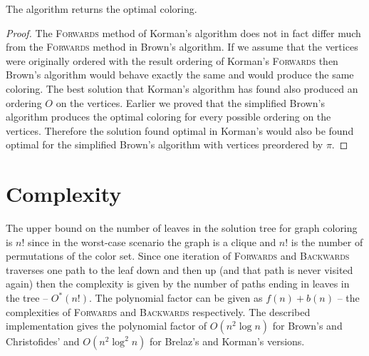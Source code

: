 \begin{theorem}
    The algorithm returns the optimal coloring.
\end{theorem}
\begin{proof}
    The \textsc{Forwards} method of Korman's algorithm does not in fact differ much from the \textsc{Forwards} method in Brown's algorithm. If we assume that the vertices were originally ordered with the result ordering of Korman's \textsc{Forwards} then Brown's algorithm would behave exactly the same and would produce the same coloring. The best solution that Korman's algorithm has found also produced an ordering $O$ on the vertices. Earlier we proved that the simplified Brown's algorithm produces the optimal coloring for every possible ordering on the vertices. Therefore the solution found optimal in Korman's would also be found optimal for the simplified Brown's algorithm with vertices preordered by $\pi$.
\end{proof}

\section{Complexity}
The upper bound on the number of leaves in the solution tree for graph coloring is $n!$ since in the worst-case scenario the graph is a clique and $n!$ is the number of permutations of the color set. Since one iteration of \textsc{Forwards} and \textsc{Backwards} traverses one path to the leaf down and then up (and that path is never visited again) then the complexity is given by the number of paths ending in leaves in the tree -- $O^*(n!)$. The polynomial factor can be given as $f(n)+b(n)$ -- the complexities of \textsc{Forwards} and \textsc{Backwards} respectively. The described implementation gives the polynomial factor of $O(n^2\log n)$ for Brown's and Christofides' and $O(n^2\log^2 n)$ for Brelaz's and Korman's versions.